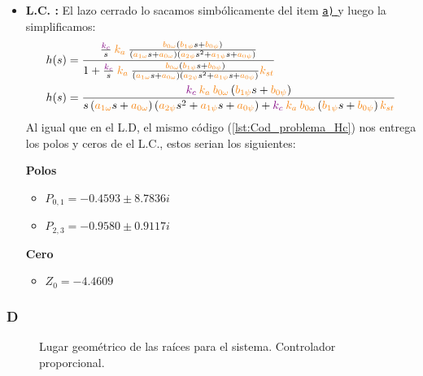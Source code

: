 \begin{itemize}
    \item \textbf{L.C. :} El lazo cerrado lo sacamos simbólicamente del item \hyperref[pregunta-a]{\texttt{a)} } y luego la simplificamos:
    \begin{align*}
        &h(s) = \dfrac{  \frac{\mora{k_c}}{s} \nara{k_a} \frac{\nara{\nara{b_{0\omega}}}\left(\nara{b_{1\psi}}s + \nara{b_{0\psi}}\right)}
        {\left(\nara{a_{1\omega}}s + \nara{a_{0\omega}}\right)\left(\nara{a_{2\psi}}s^{2} + \nara{a_{1\psi}}s + \nara{a_{0\psi}}\right)}   }{  1+  \frac{\mora{k_c}}{s} \nara{k_a} \frac{\nara{\nara{b_{0\omega}}}\left(\nara{b_{1\psi}}s + \nara{b_{0\psi}}\right)}
        {\left(\nara{a_{1\omega}}s + \nara{a_{0\omega}}\right)\left(\nara{a_{2\psi}}s^{2} + \nara{a_{1\psi}}s + \nara{a_{0\psi}}\right)}\nara{k_{st}}  } \\
        &h(s) = \dfrac{     \mora{k_c} \nara{k_a}    \nara{\nara{b_{0\omega}}}\left(\nara{b_{1\psi}}s + \nara{b_{0\psi}}\right)    }{    s \left(\nara{a_{1\omega}}s + \nara{a_{0\omega}}\right)\left(\nara{a_{2\psi}}s^{2} + \nara{a_{1\psi}}s + \nara{a_{0\psi}}\right)    + \mora{k_c} \nara{k_a}     \nara{\nara{b_{0\omega}}}\left(\nara{b_{1\psi}}s + \nara{b_{0\psi}}\right)   
       \nara{k_{st}}   }
    \end{align*}
    Al igual que en el L.D, el mismo código (\autoref{lst:Cod_problema_Hc}) nos entrega los polos y ceros de el L.C., estos serian los siguientes:
    \begin{multicols}{2}
        \textbf{Polos}
        \begin{itemize}
            \item \(P_{0,1} = -0.4593 \pm 8.7836i\) 
            \item \(P_{2,3} = -0.9580 \pm 0.9117i\) 
        \end{itemize}
        \columnbreak
        \textbf{Cero}
        \begin{itemize}
            \item \(Z_0 = -4.4609\)
        \end{itemize}
      \end{multicols}
\end{itemize}



\FloatBarrier
\subsubsection{D}%

\begin{figure}[ht]
    \centering
    
    \caption{Lugar geométrico de las raíces para el sistema. Controlador proporcional.}
    \label{fig:lgr-h}
  \end{figure}
  
